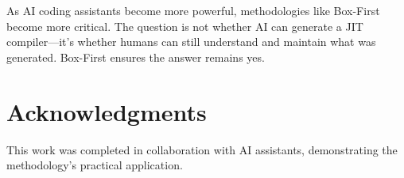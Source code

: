 \documentclass[10pt,conference]{IEEEtran}
\begin{document}
As AI coding assistants become more powerful, methodologies like Box-First become more critical. The question is not whether AI can generate a JIT compiler---it's whether humans can still understand and maintain what was generated. Box-First ensures the answer remains yes.

\section*{Acknowledgments}

This work was completed in collaboration with AI assistants, demonstrating the methodology's practical application.



\end{document}
